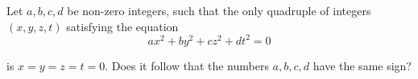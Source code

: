 Let $a,b,c,d$ be non-zero integers, such that the only quadruple of integers $(x, y, z, t)$ satisfying the equation\[ax^2+by^2+cz^2+dt^2=0\]

is $x=y=z=t=0$. Does it follow that the numbers $a,b,c,d$ have the same sign?